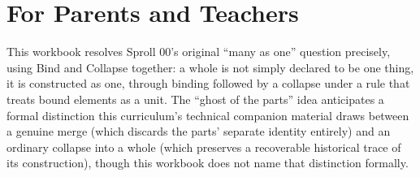 \documentclass[11pt]{book}
\begin{document}
\chapter*{For Parents and Teachers}

This workbook resolves Sproll 00's original ``many as one'' question precisely, using Bind and Collapse together: a whole is not simply declared to be one thing, it is constructed as one, through binding followed by a collapse under a rule that treats bound elements as a unit. The ``ghost of the parts'' idea anticipates a formal distinction this curriculum's technical companion material draws between a genuine merge (which discards the parts' separate identity entirely) and an ordinary collapse into a whole (which preserves a recoverable historical trace of its construction), though this workbook does not name that distinction formally.
\end{document}
